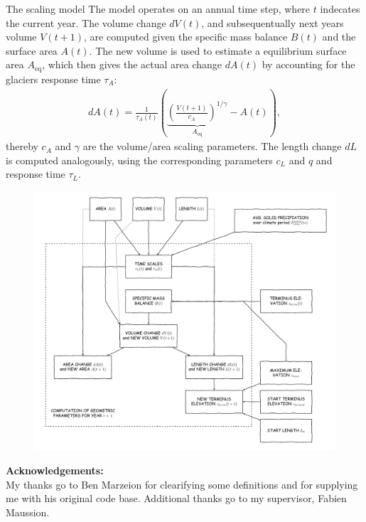 \documentclass[final]{beamer}
\begin{document}
\begin{frame}[fragile]
\begin{columns}[t]
\begin{leftcolumn}
   \begin{boxblock}{The scaling model}
      The model operates on an annual time step, where $t$ indecates the current year. The volume change $dV(t)$, and subsequentually next years volume \mbox{$V(t+1)$}, are computed given the specific mass balance $B(t)$ and the surface area $A(t)$. The new volume is used to estimate a equilibrium surface area $A_\text{eq}$, which then gives the actual area change $dA(t)$ by accounting for the glaciers response time $\tau_A$:
      \begin{align}
         dA(t) = \frac{1}{\tau_A(t)} \left(\underbrace{\left(\frac{V(t+1)}{c_A}\right)^{1/\gamma}}_{A_\text{eq}} - A(t)\right),
      \end{align}
      thereby $c_A$ and $\gamma$ are the volume/area scaling parameters. The length change $dL$ is computed analogously, using the corresponding parameters $c_L$ and $q$ and response time $\tau_L$.
      \begin{figure}
         \centering
         \includegraphics[width=1\textwidth]{../flowchart/scaling.pdf}
         \label{fig:flowchart}
      \end{figure}
   \end{boxblock} %

   \begin{footnotesize}

      \textbf{Acknowledgements:} \\
      My thanks go to Ben Marzeion for clearifying some definitions and for supplying me with his original code base. Additional thanks go to my supervisor, Fabien Maussion.\\


\end{footnotesize}
\end{leftcolumn}
\end{columns}
\end{frame}
\end{document}
